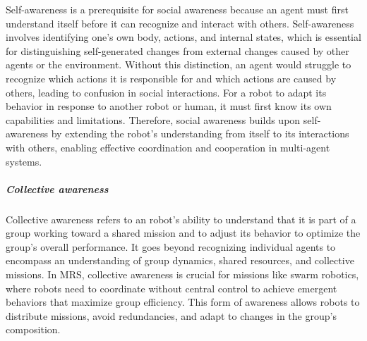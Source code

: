 \documentclass{book}
\begin{document}
Self-awareness is a prerequisite for social awareness because an agent must first understand itself before it can recognize and interact with others. Self-awareness involves identifying one’s own body, actions, and internal states, which is essential for distinguishing self-generated changes from external changes caused by other agents or the environment. Without this distinction, an agent would struggle to recognize which actions it is responsible for and which actions are caused by others, leading to confusion in social interactions. For a robot to adapt its behavior in response to another robot or human, it must first know its own capabilities and limitations. Therefore, social awareness builds upon self-awareness by extending the robot’s understanding from itself to its interactions with others, enabling effective coordination and cooperation in multi-agent systems.



\subparagraph{Collective awareness}
Collective awareness refers to an robot's ability to understand that it is part of a group working toward a shared mission and to adjust its behavior to optimize the group's overall performance. It goes beyond recognizing individual agents to encompass an understanding of group dynamics, shared resources, and collective missions. In MRS, collective awareness is crucial for missions like swarm robotics, where robots need to coordinate without central control to achieve emergent behaviors that maximize group efficiency. This form of awareness allows robots to distribute missions, avoid redundancies, and adapt to changes in the group’s composition.
\end{document}
